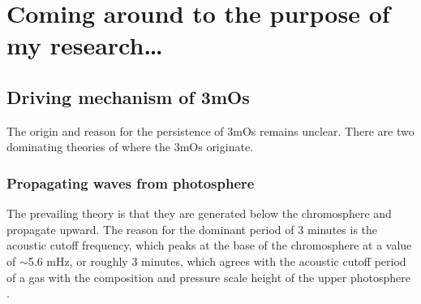 %
%
%


\section{Coming around to the purpose of my research\ldots}
\subsection{Driving mechanism of 3mOs}

The origin and reason for the persistence of 3mOs remains unclear.
There are two dominating theories of where the 3mOs originate.

\subsubsection{Propagating waves from photosphere}


The prevailing theory is that they are generated below the chromosphere and
propagate upward.
The reason for the dominant period of 3 minutes
is the acoustic cutoff frequency, which peaks
at the base of the chromosphere at a value of $\sim$5.6 mHz,
or roughly 3 minutes, which agrees with the acoustic cutoff period of a gas with
the composition and pressure scale height of the upper photosphere
\citep{Kalkofen1994}.

